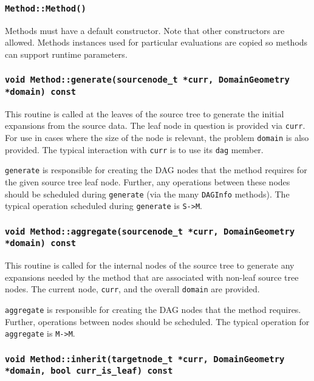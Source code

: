 \subsubsection{\texttt{Method::Method()}}

Methods must have a default constructor. Note that other constructors are
allowed. Methods instances used for particular evaluations are copied so
methods can support runtime parameters.

\subsubsection{\texttt{void Method::generate(sourcenode\_t *curr, DomainGeometry *domain) const}}

This routine is called at the leaves of the source tree to generate the initial
expansions from the source data. The leaf node in question is provided via
\texttt{curr}. For use in cases where the size of the node is relevant,
the problem \texttt{domain} is also provided. The typical interaction with
\texttt{curr} is to use its \texttt{dag} member.

\texttt{generate} is responsible for creating the DAG nodes that the method
requires for the given source tree leaf node. Further, any operations between
these nodes should be scheduled during \texttt{generate} (via the many
\texttt{DAGInfo} methods). The typical operation scheduled during
\texttt{generate} is \texttt{S->M}.


\subsubsection{\texttt{void Method::aggregate(sourcenode\_t *curr, DomainGeometry *domain) const}}

This routine is called for the internal nodes of the source tree to generate
any expansions needed by the method that are associated with non-leaf source
tree nodes. The current node, \texttt{curr}, and the overall \texttt{domain}
are provided.

\texttt{aggregate} is responsible for creating the DAG nodes that the method
requires. Further, operations between nodes should be scheduled. The typical
operation for \texttt{aggregate} is \texttt{M->M}.

\subsubsection{\texttt{void Method::inherit(targetnode\_t *curr, DomainGeometry *domain, bool curr\_is\_leaf) const}}

